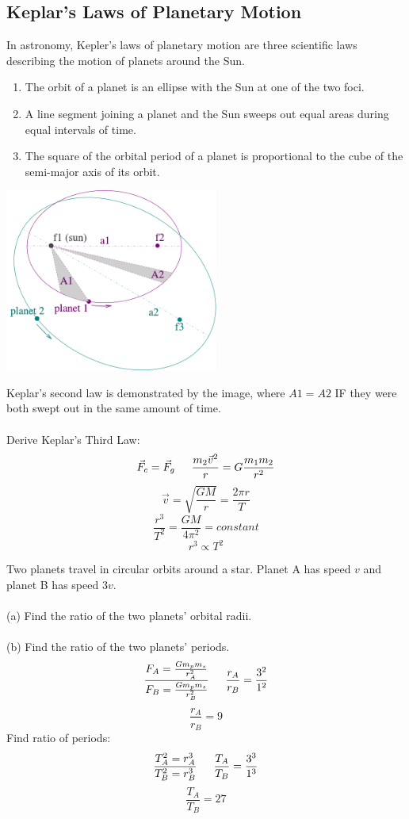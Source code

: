 \documentclass{article}
\begin{document}
\subsection{Keplar's Laws of Planetary Motion}
In astronomy, Kepler's laws of planetary motion are three scientific laws describing the motion of planets around the Sun.
\vspace{1ex}
\begin{enumerate}
\item The orbit of a planet is an ellipse with the Sun at one of the two foci.
\item A line segment joining a planet and the Sun sweeps out equal areas during equal intervals of time.
\item The square of the orbital period of a planet is proportional to the cube of the semi-major axis of its orbit.
\end{enumerate}
\begin{multicols}{2}
  \centerline{\includegraphics[width=7cm]{keplar.png}}
  \columnbreak
  Keplar's second law is demonstrated by the image, where $A1=A2$ IF they were both swept out in the same amount of time.
  \\\\
  Derive Keplar's Third Law:
  \[
  \vec{F}_c=\vec{F}_g \indent
  \frac{m_2\vec{v}^2}{r}=G\frac{m_1m_2}{r^2}
  \]
  \[
  \vec{v}=\sqrt{\frac{GM}{r}}=\frac{2\pi r}{T}
  \]
  \[
  \frac{r^3}{T^2}=\frac{GM}{4\pi^2} = constant
  \]
  \[
  r^3 \propto T^2
  \]
\end{multicols}

\begin{multicols}{2}
  
  Two planets travel in circular orbits around a star.  Planet A has speed $v$ and planet B has speed $3v$.\\\\ (a) Find the ratio of the two planets’ orbital radii.\\\\ (b) Find the ratio of the two planets’ periods.
  \vfill
  \columnbreak
  \[
  \frac
      {F_A=\frac{Gm_pm_s}{r_A^2}}
      {F_B=\frac{Gm_pm_s}{r_B^2}}
      \indent
      \frac{r_A}{r_B}=\frac
           {3^2}
           {1^2}
	   \]
	   \[
           \frac{r_A}{r_B}=9
	   \]
	   Find ratio of periods:
	   \[
           \frac
               {T_A^2=r_A^3}
               {T_B^2=r_B^3}
               \indent
               \frac
                   {T_A}
		   {T_B} = \frac{3^3}{1^3}
		   \]
		   \[
             	   \frac{T_A}{T_B}=27
		   \]
\end{multicols}
\end{document}
